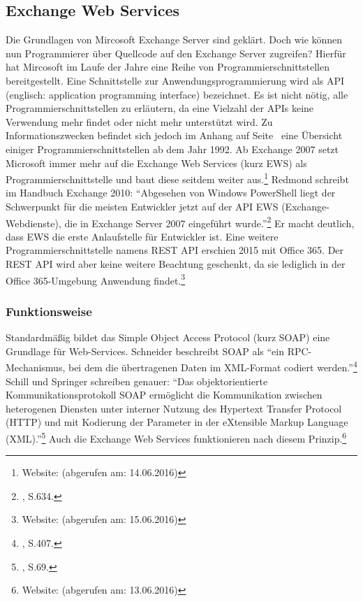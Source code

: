 \subsection{Exchange Web Services}
\noindent
Die Grundlagen von Mircosoft Exchange Server sind geklärt. Doch wie können nun Programmierer über Quellcode auf den Exchange Server zugreifen? Hierfür hat Mircosoft im Laufe der Jahre eine Reihe von Programmierschnittstellen bereitgestellt. Eine Schnittstelle zur Anwendungsprogrammierung wird als API (englisch: application programming interface) bezeichnet. Es ist nicht nötig, alle Programmierschnittstellen zu erläutern, da eine Vielzahl der APIs keine Verwendung mehr findet oder nicht mehr unterstützt wird. Zu Informationszwecken befindet sich jedoch im Anhang auf Seite~\pageref{API_Geschichte} eine Übersicht einiger Programmierschnittstellen ab dem Jahr 1992. Ab Exchange 2007 setzt Microsoft immer mehr auf die Exchange Web Services (kurz EWS) als Programmierschnittstelle und baut diese seitdem weiter aus.\footnote{Website: \citeauthor{MSXews} (abgerufen am: 14.06.2016)}
Redmond schreibt im Handbuch Exchange 2010: 
\enquote{Abgesehen von Windows PowerShell liegt der Schwerpunkt für die meisten Entwickler jetzt auf der API EWS (Exchange-Webdienste), die in Exchange Server 2007 eingeführt wurde.}\footnote{\citeauthor{Redmond} \citeyear{Redmond}, S.634.}
Er macht deutlich, dass EWS die erste Anlaufstelle für Entwickler ist. Eine weitere Programmierschnittstelle namens REST API erschien 2015 mit Office 365. Der REST API wird aber keine weitere Beachtung geschenkt, da sie lediglich in der Office 365-Umgebung Anwendung findet.\footnote{Website: \citeauthor{MicrosoftAPI} (abgerufen am: 15.06.2016)}


\subsubsection{Funktionsweise}
\noindent
Standardmäßig bildet das Simple Object Access Protocol (kurz SOAP) eine Grundlage für Web-Services. Schneider beschreibt SOAP als \enquote{ein RPC-Mechanismus, bei dem die übertragenen Daten im XML-Format codiert werden.}\footnote{\citeauthor{Schneider} \citeyear{Schneider}, S.407.}
Schill und Springer schreiben genauer: \enquote{Das objektorientierte Kommunikationsprotokoll SOAP ermöglicht die Kommunikation zwischen heterogenen Diensten unter interner Nutzung
des Hypertext Transfer Protocol (HTTP) und mit Kodierung der Parameter in der eXtensible Markup Language (XML).}\footnote{\citeauthor{Schill} \citeyear{Schill}, S.69.}
Auch die Exchange Web Services funktionieren nach diesem Prinzip.\footnote{Website: \citeauthor{MicrosoftSDK} (abgerufen am: 13.06.2016)}
 
